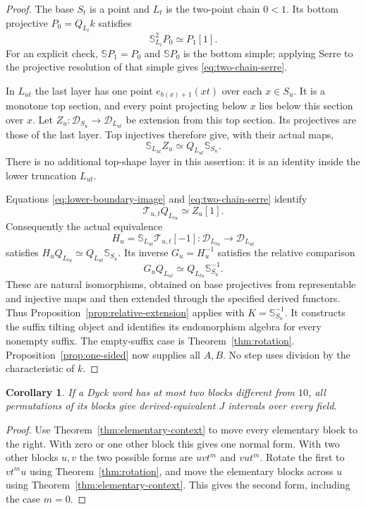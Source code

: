 \documentclass[11pt]{article}
\newtheorem{corollary}[theorem]{Corollary}
\theoremstyle{definition}
\begin{document}
\begin{proof}
The base $S_t$ is a point and $L_t$ is the two-point chain $0<1$.
Its bottom projective $P_0=Q_{L_t}k$ satisfies
\begin{equation}\label{eq:two-chain-serre}
 \mathbb S_{L_t}^2P_0\simeq P_1[1].
\end{equation}
For an explicit check, $\mathbb S P_1=P_0$ and
$\mathbb S P_0$ is the bottom simple; applying Serre to the
projective resolution of that simple gives \eqref{eq:two-chain-serre}.

In $L_{ut}$ the last layer has one point $e_{b(x)+1}(xt)$ over
each $x\in S_u$. It is a monotone top section, and every point
projecting below $x$ lies below this section over $x$.
Let $Z_u:\mathcal D_{S_u}\to\mathcal D_{L_{ut}}$ be extension
from this top section. Its projectives are those of the last
layer. Top injectives therefore give, with their actual maps,
\begin{equation}\label{eq:elementary-top-serre}
 \mathbb S_{L_{ut}}Z_u\simeq Q_{L_{ut}}\mathbb S_{S_u}.
\end{equation}
There is no additional top-shape layer in this assertion: it is
an identity inside the lower truncation $L_{ut}$.

Equations \eqref{eq:lower-boundary-image} and
\eqref{eq:two-chain-serre} identify
\[
 \mathcal T_{u,t}Q_{L_{tu}}\simeq Z_u[1].
\]
Consequently the actual equivalence
\[
 H_u=\mathbb S_{L_{ut}}\mathcal T_{u,t}[-1]:
       \mathcal D_{L_{tu}}\longrightarrow\mathcal D_{L_{ut}}
\]
satisfies $H_uQ_{L_{tu}}\simeq Q_{L_{ut}}\mathbb S_{S_u}$.
Its inverse $G_u=H_u^{-1}$ satisfies the relative comparison
\[
 G_u Q_{L_{ut}}\simeq Q_{L_{tu}}\mathbb S_{S_u}^{-1}.
\]
These are natural isomorphisms, obtained on base projectives from
representable and injective maps and then extended through the
specified derived functors. Thus
Proposition~\ref{prop:relative-extension} applies with
$K=\mathbb S_{S_u}^{-1}$. It constructs the suffix tilting object
and identifies its endomorphism algebra for every nonempty suffix.
The empty-suffix case is Theorem~\ref{thm:rotation}.
Proposition~\ref{prop:one-sided} now supplies all $A,B$.
No step uses division by the characteristic of $k$.
\end{proof}

\begin{corollary}\label{cor:two-non-elementary}
If a Dyck word has at most two blocks different from $10$, all
permutations of its blocks give derived-equivalent $J$ intervals
over every field.
\end{corollary}
\begin{proof}
Use Theorem~\ref{thm:elementary-context} to move every elementary
block to the right. With zero or one other block this gives one
normal form. With two other blocks $u,v$ the two possible forms
are $uvt^m$ and $vut^m$. Rotate the first to $vt^mu$ using
Theorem~\ref{thm:rotation}, and move the elementary blocks across
$u$ using Theorem~\ref{thm:elementary-context}. This gives the
second form, including the case $m=0$.
\end{proof}
\end{document}
